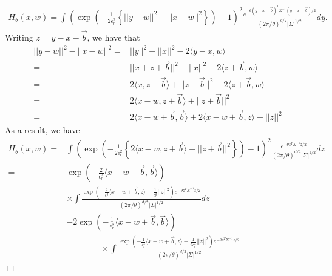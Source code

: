 \documentclass[12pt]{article}
\newenvironment {proof}{{\noindent\bf Proof }}{\hfill $\Box$ \medskip}
\newcommand{\meanq}{\vec b}    %
\newcommand{\covq}{\Sigma}     %
\begin{document}
\begin{proof}
\begin{align}
H_\theta(x, w)
=
\int
    \left(
        \exp\left(
            - \frac{1}{2\epsilon_r^2}
            \left\{
                ||y - w||^2 - ||x - w||^2
            \right\}
        \right)
        -
        1
    \right)^2
    \frac{
        e^{-\theta (y - x-\meanq)^{T}\covq^{-1}(y - x-\meanq)  / 2}
    }{
        (2 \pi/ \theta)^{d/2} |\covq|^{1/2}
    }
dy.
\end{align}
Writing $z=y-x-\meanq$, we have that 
\begin{equation}
\begin{aligned}
||y - w||^2 - ||x - w||^2 
=& ||y||^2-||x||^2 -2\langle y-x, w\rangle \\
=&||x+z+ \meanq||^2-||x||^2-2 \langle z+ \meanq, w\rangle\\
=&2\langle x, z+ \meanq \rangle + ||z+ \meanq||^2-2 \langle z+ \meanq, w\rangle \\
=& 2 \langle x-w, z+ \meanq \rangle + ||z+ \meanq||^2\\
=& 2\langle x-w+ \meanq,\meanq \rangle + 2\langle x-w+ \meanq, z \rangle +||z||^2
\end{aligned}
\end{equation}
As a result, we have 
\begin{align}
H_\theta(x, w)
=&
\int
    \left(
        \exp\left(
            - \frac{1}{2\epsilon_r^2}
            \left\{
                2 \langle x-w, z+ \meanq \rangle + ||z+ \meanq||^2
            \right\}
        \right)
        -
        1
    \right)^2
    \frac{
        e^{-\theta z^{T}\covq^{-1}z  / 2}
    }{
        (2 \pi/ \theta)^{d/2} |\covq|^{1/2}
    }
dz\\
=&\exp\left(-\frac{2}{\epsilon_r^2}\langle x-w+ \meanq,\meanq \rangle \right)\\
& \times \int
        \frac{
        \exp\left(
            - \frac{2}{\epsilon_r^2} \langle x-w+ \meanq, z \rangle
            - \frac{1}{\epsilon_r^2} ||z||^2
            \right)
            e^{-\theta z^{T}\covq^{-1}z  / 2}
    }{
        (2 \pi/ \theta)^{d/2} |\covq|^{1/2}
    }
dz\\ \label{eq: Second moment term matrix calculation}
&-2\exp\left(-\frac{1}{\epsilon_r^2}\langle x-w+ \meanq,\meanq \rangle \right)\\
& \qquad \qquad \times     \int
    \frac{ \exp\left(
             -\frac{1}{\epsilon_r^2}\langle x-w+ \meanq, z \rangle
              -\frac{1}{2\epsilon_r^2} ||z||^2
            \right)e^{-\theta z^{T}\covq^{-1}z  / 2}
        }{
        (2 \pi/ \theta)^{d/2} |\covq|^{1/2} \label{eq: first moment term matrix calculation}
}
\end{align}
\end{proof}
\end{document}
